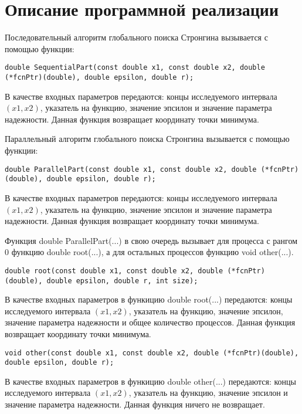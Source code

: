 \documentclass{report}
\begin{document}
\section*{Описание программной реализации}
Последовательный алгоритм глобального поиска Стронгина вызывается с помощью функции:
\begin{lstlisting}
double SequentialPart(const double x1, const double x2, double (*fcnPtr)(double), double epsilon, double r);
\end{lstlisting}
\par В качестве входных параметров передаются: концы исследуемого интервала $(x1, x2)$, указатель на функцию, значение эпсилон и значение параметра надежности. Данная функция возвращает координату точки минимума.
\par Параллельный алгоритм глобального поиска Стронгина вызывается с помощью функции:
\begin{lstlisting}
double ParallelPart(const double x1, const double x2, double (*fcnPtr)(double), double epsilon, double r);
\end{lstlisting}
\par В качестве входных параметров передаются: концы исследуемого интервала $(x1, x2)$, указатель на функцию, значение эпсилон и значение параметра надежности. Данная функция возвращает координату точки минимума.
\par Функция double ParallelPart(...) в свою очередь вызывает для процесса с рангом 0 функцию double root(...), а для остальных процессов функцию void other(...).
\begin{lstlisting}
double root(const double x1, const double x2, double (*fcnPtr)(double), double epsilon, double r, int size);
\end{lstlisting}
\par В качестве входных параметров в функицию double root(...) передаются: концы исследуемого интервала $(x1, x2)$, указатель на функцию, значение эпсилон, значение параметра надежности и общее количество процессов. Данная функция возвращает координату точки минимума.
\begin{lstlisting}
void other(const double x1, const double x2, double (*fcnPtr)(double), double epsilon, double r);
\end{lstlisting}
\par В качестве входных параметров в функицию double other(...) передаются: концы исследуемого интервала $(x1, x2)$, указатель на функцию, значение эпсилон и значение параметра надежности. Данная функция ничего не возвращает.
\newpage
\end{document}
